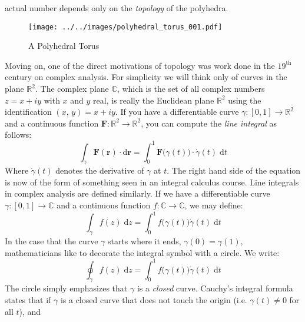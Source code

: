     actual number depends only on the \textit{topology} of the polyhedra.
    \begin{figure}
        \centering
        \texttt{[image: ../../images/polyhedral\_torus\_001.pdf]}
        \caption{A Polyhedral Torus}
        \label{fig:polyhedral_torus_001}
    \end{figure}
    \par\hfill\par
    Moving on, one of the direct motivations of topology was work done in the
    $19^{\textrm{th}}$ century on complex analysis. For simplicity we will
    think only of curves in the plane $\mathbb{R}^{2}$. The complex plane
    $\mathbb{C}$, which is the set of all complex numbers $z=x+iy$ with
    $x$ and $y$ real, is really the Euclidean plane $\mathbb{R}^{2}$
    using the identification $(x,\,y)=x+iy$. If you have a
    differentiable curve $\gamma:[0,1]\rightarrow\mathbb{R}^{2}$ and a
    continuous function
    $\mathbf{F}:\mathbb{R}^{2}\rightarrow\mathbb{R}^{2}$, you can compute the
    \textit{line integral} as follows:
    \begin{equation}
        \int_{\gamma}\mathbf{F}(\mathbf{r})\cdot\textrm{d}\mathbf{r}
            =\int_{0}^{1}\mathbf{F}\big(\gamma(t)\big)\cdot
                \dot{\gamma}(t)\;\textrm{d}t
    \end{equation}
    Where $\dot{\gamma}(t)$ denotes the derivative of $\gamma$ at $t$.
    The right hand side of the equation is now of the form of something seen
    in an integral calculus course. Line integrals in complex analysis are
    defined similarly. If we have a differentiable curve
    $\gamma:[0,1]\rightarrow\mathbb{C}$ and a continuous function
    $f:\mathbb{C}\rightarrow\mathbb{C}$, we may define:
    \begin{equation}
        \int_{\gamma}f(z)\;\textrm{d}z
            =\int_{0}^{1}f\big(\gamma(t)\big)\dot{\gamma}(t)\;\textrm{d}t
    \end{equation}
    In the case that the curve $\gamma$ starts where it ends,
    $\gamma(0)=\gamma(1)$, mathematicians like to decorate the integral symbol
    with a circle. We write:
    \begin{equation}
        \oint_{\gamma}f(z)\;\textrm{d}z=
            \int_{0}^{1}f\big(\gamma(t)\big)\dot{\gamma}(t)\;\textrm{d}t
    \end{equation}
    The circle simply emphasizes that $\gamma$ is a \textit{closed} curve.
    Cauchy's integral formula states that if $\gamma$ is a closed curve that
    does not touch the origin (i.e. $\gamma(t)\ne{0}$ for all $t$), and
